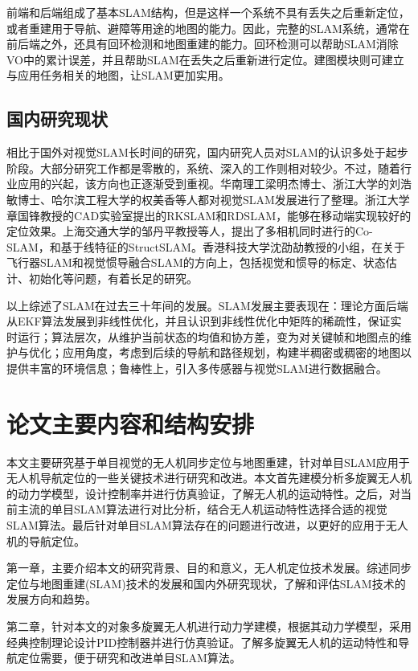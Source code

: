 前端和后端组成了基本SLAM结构，但是这样一个系统不具有丢失之后重新定位，或者重建用于导航、避障等用途的地图的能力。因此，完整的SLAM系统，通常在前后端之外，还具有回环检测和地图重建的能力。回环检测可以帮助SLAM消除VO中的累计误差，并且帮助SLAM在丢失之后重新进行定位\upcite{[1.40]}。建图模块则可建立与应用任务相关的地图，让SLAM更加实用\upcite{[1.41]}。


\subsection{国内研究现状}
相比于国外对视觉SLAM长时间的研究，国内研究人员对SLAM的认识多处于起步阶段。大部分研究工作都是零散的，系统、深入的工作则相对较少。不过，随着行业应用的兴起，该方向也正逐渐受到重视。华南理工梁明杰博士\upcite{[1.42]}、浙江大学的刘浩敏博士\upcite{[1.43]}、哈尔滨工程大学的权美香\upcite{[1.44]}等人都对视觉SLAM发展进行了整理。浙江大学章国锋教授的CAD实验室提出的RKSLAM\upcite{[1.45]}和RDSLAM\upcite{[1.46]}，能够在移动端实现较好的定位效果。上海交通大学的邹丹平教授等人，提出了多相机同时进行的Co-SLAM\upcite{[1.47]}，和基于线特征的StructSLAM\upcite{[1.48]}。香港科技大学沈劭劼教授\upcite{[1.49]}的小组，在关于飞行器SLAM和视觉惯导融合SLAM的方向上，包括视觉和惯导的标定、状态估计、初始化等问题，有着长足的研究。


以上综述了SLAM在过去三十年间的发展。SLAM发展主要表现在：理论方面后端从EKF算法发展到非线性优化，并且认识到非线性优化中矩阵的稀疏性，保证实时运行；算法层次，从维护当前状态的均值和协方差，变为对关键帧和地图点的维护与优化；应用角度，考虑到后续的导航和路径规划，构建半稠密或稠密的地图以提供丰富的环境信息；鲁棒性上，引入多传感器与视觉SLAM进行数据融合。

\section{论文主要内容和结构安排}
本文主要研究基于单目视觉的无人机同步定位与地图重建，针对单目SLAM应用于无人机导航定位的一些关键技术进行研究和改进。本文首先建模分析多旋翼无人机的动力学模型，设计控制率并进行仿真验证，了解无人机的运动特性。之后，对当前主流的单目SLAM算法进行对比分析，结合无人机运动特性选择合适的视觉SLAM算法。最后针对单目SLAM算法存在的问题进行改进，以更好的应用于无人机的导航定位。

第一章，主要介绍本文的研究背景、目的和意义，无人机定位技术发展。综述同步定位与地图重建(SLAM)技术的发展和国内外研究现状，了解和评估SLAM技术的发展方向和趋势。

第二章，针对本文的对象多旋翼无人机进行动力学建模，根据其动力学模型，采用经典控制理论设计PID控制器并进行仿真验证。了解多旋翼无人机的运动特性和导航定位需要，便于研究和改进单目SLAM算法。

